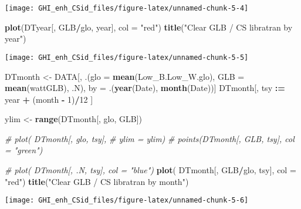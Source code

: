 \documentclass[
  10pt,
  a4paper,oneside]{article}
\newenvironment{Shaded}{\begin{snugshade}}{\end{snugshade}}
\newcommand{\AttributeTok}[1]{\textcolor[rgb]{0.13,0.29,0.53}{#1}}
\newcommand{\CommentTok}[1]{\textcolor[rgb]{0.56,0.35,0.01}{\textit{#1}}}
\newcommand{\DecValTok}[1]{\textcolor[rgb]{0.00,0.00,0.81}{#1}}
\newcommand{\FunctionTok}[1]{\textcolor[rgb]{0.13,0.29,0.53}{\textbf{#1}}}
\newcommand{\NormalTok}[1]{#1}
\newcommand{\OtherTok}[1]{\textcolor[rgb]{0.56,0.35,0.01}{#1}}
\newcommand{\SpecialCharTok}[1]{\textcolor[rgb]{0.81,0.36,0.00}{\textbf{#1}}}
\newcommand{\StringTok}[1]{\textcolor[rgb]{0.31,0.60,0.02}{#1}}
\begin{document}
\begin{center}\texttt{[image: GHI\_enh\_CSid\_files/figure-latex/unnamed-chunk-5-4]} \end{center}

\begin{Shaded}
\begin{Highlighting}[]
\FunctionTok{plot}\NormalTok{(DTyear[, GLB}\SpecialCharTok{/}\NormalTok{glo, year], }\AttributeTok{col =} \StringTok{"red"}\NormalTok{)}
\FunctionTok{title}\NormalTok{(}\StringTok{"Clear GLB / CS libratran by year"}\NormalTok{)}
\end{Highlighting}
\end{Shaded}

\begin{center}\texttt{[image: GHI\_enh\_CSid\_files/figure-latex/unnamed-chunk-5-5]} \end{center}

\begin{Shaded}
\begin{Highlighting}[]
\NormalTok{DTmonth }\OtherTok{\textless{}{-}}\NormalTok{ DATA[, .(}\AttributeTok{glo =} \FunctionTok{mean}\NormalTok{(Low\_B.Low\_W.glo),}
                    \AttributeTok{GLB =} \FunctionTok{mean}\NormalTok{(wattGLB),}
\NormalTok{                    .N),}
\NormalTok{                by }\OtherTok{=}\NormalTok{ .(}\FunctionTok{year}\NormalTok{(Date), }\FunctionTok{month}\NormalTok{(Date))]}
\NormalTok{DTmonth[, tsy }\SpecialCharTok{:=}\NormalTok{ year }\SpecialCharTok{+}\NormalTok{ (month }\SpecialCharTok{{-}} \DecValTok{1}\NormalTok{)}\SpecialCharTok{/}\DecValTok{12}\NormalTok{ ]}


\NormalTok{ylim }\OtherTok{\textless{}{-}} \FunctionTok{range}\NormalTok{(DTmonth[, glo, GLB])}

\CommentTok{\# plot(  DTmonth[, glo, tsy],}
\CommentTok{\#        ylim = ylim)}
\CommentTok{\# points(DTmonth[, GLB, tsy], col = "green")}

\CommentTok{\# plot(  DTmonth[, .N, tsy], col = "blue")}
\FunctionTok{plot}\NormalTok{(  DTmonth[, GLB}\SpecialCharTok{/}\NormalTok{glo, tsy], }\AttributeTok{col =} \StringTok{"red"}\NormalTok{)}
\FunctionTok{title}\NormalTok{(}\StringTok{"Clear GLB / CS libratran by month"}\NormalTok{)}
\end{Highlighting}
\end{Shaded}

\begin{center}\texttt{[image: GHI\_enh\_CSid\_files/figure-latex/unnamed-chunk-5-6]} \end{center}
\end{document}
